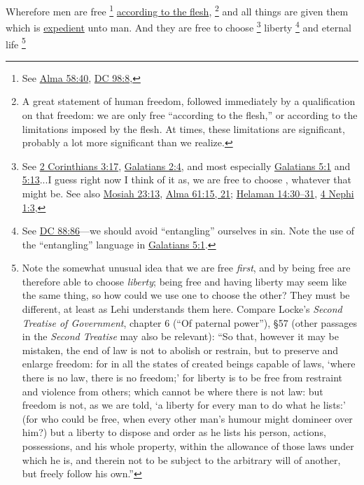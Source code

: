 			Wherefore men are free%
				\footnote{%
					See \hyperref[ALMA-58-40]{Alma 58:40}, \hyperref[DC98-8]{DC 98:8},
					}
			\hyperref[FLESH-PHRASES]{according to the flesh},%
				\footnote{%
					\label{2NEPHI-2-27-flesh}%
					A great statement of human freedom, followed immediately by a qualification on that freedom: we are only free ``according to the flesh,'' or according to the limitations imposed by the flesh. At times, these limitations are significant, probably a lot more significant than we realize.
					}
			and all things are given them which is \hyperref[EXPEDIENT-1828]{expedient} unto man.
			And they are free to choose%
				\footnote{%
					See \hyperref[2CORINTHIANS-3-17]{2 Corinthians 3:17}, \hyperref[GALATIANS-2-4]{Galatians 2:4}, and most especially \hyperref[GALATIANS-5-1]{Galatians 5:1} and \hyperref[GALATIANS-5-13]{5:13}...I guess right now I think of it as, we are free to choose , whatever that might be. See also \hyperref[MOSIAH-23-13]{Mosiah 23:13}, \hyperref[ALMA-61-15]{Alma 61:15, 21}; \hyperref[HELAMAN-14-30]{Helaman 14:30--31}, \hyperref[4NEPHI-1-3]{4 Nephi 1:3},
					}%
			liberty%
				\footnote{%
					See \hyperref[DC88-86]{DC 88:86}---we should avoid ``entangling'' ourselves in sin. Note the use of the ``entangling'' language in \hyperref[GALATIANS-5-1]{Galatians 5:1}. 
					}
			and eternal life%
				\footnote{%
					\label{2NEPHI-2-27-liberty}%
					Note the somewhat unusual idea that we are free \textit{first}, and by being free are therefore able to choose \textit{liberty}; being free and having liberty may seem like the same thing, so how could we use one to choose the other? They must be different, at least as Lehi understands them here. Compare Locke's \textit{Second Treatise of Government}, chapter 6 (``Of paternal power''), \S57 (other passages in the \textit{Second Treatise} may also be relevant): ``So that, however it may be mistaken, the end of law is not to abolish or restrain, but to preserve and enlarge freedom: for in all the states of created beings capable of laws, `where there is no law, there is no freedom;' for liberty is to be free from restraint and violence from others; which cannot be where there is not law: but freedom is not, as we are told, `a liberty for every man to do what he lists:' (for who could be free, when every other man's humour might domineer over him?) but a liberty to dispose and order as he lists his person, actions, possessions, and his whole property, within the allowance of those laws under which he is, and therein not to be subject to the arbitrary will of another, but freely follow his own.''
					}
